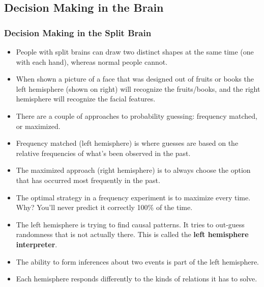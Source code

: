 \documentclass[]{article}
\newcommand{\lecture}[1]{\marginpar{{\footnotesize $\leftarrow$ \underline{#1}}}}
\begin{document}
		\subsection{Decision Making in the Brain} \lecture{March 28, 2013}
			\subsubsection{Decision Making in the Split Brain}
				\begin{itemize}
					\item People with split brains can draw two distinct shapes at the same time (one with each hand), whereas normal people cannot.
					\item When shown a picture of a face that was designed out of fruits or books the left hemisphere (shown on right) will recognize the fruits/books, and the right hemisphere will recognize the facial features.
					\item There are a couple of approaches to probability guessing: frequency matched, or maximized.
					\item Frequency matched (left hemisphere) is where guesses are based on the relative frequencies of what's been observed in the past.
					\item The maximized approach (right hemisphere) is to always choose the option that has occurred most frequently in the past.
					\item The optimal strategy in a frequency experiment is to maximize every time. Why? You'll never predict it correctly 100\% of the time.
					\item The left hemisphere is trying to find causal patterns. It tries to out-guess randomness that is not actually there. This is called the \textbf{left hemisphere interpreter}.
					\item The ability to form inferences about two events is part of the left hemisphere.
					\item Each hemisphere responds differently to the kinds of relations it has to solve.
				\end{itemize}
\end{document}
